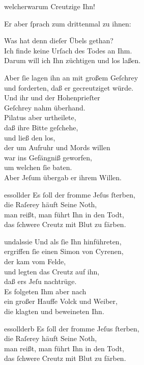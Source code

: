 \documentclass[tocstyle=ref-genre]{ees}
\begin{document}
{\begin{movement}{welcherwarum}
  \voice[Chor]
  Creutzige Ihn!

  \voice[Evangelist]
  Er aber ſprach zum drittenmal zu ihnen:

  \voice[Pilatus]
  Was hat denn dieſer Übels gethan?\\
  Ich finde keine Urſach des Todes an Ihm.\\
  Darum will ich Ihn züchtigen und los laßen.

  \voice[Evangelist]
  Aber ſie lagen ihn an mit großem Geſchrey\\
  und forderten, daß er gecreutziget würde.\\
  Und ihr und der Hohenprieſter\\
  Geſchrey nahm überhand.\\
  Pilatus aber urtheilete,\\
  daß ihre Bitte geſchehe,\\
  und ließ den los,\\
  der um Aufruhr und Mords willen\\
  war ins Gefängniß geworfen,\\
  um welchen ſie baten.\\
  Aber Jeſum übergab er ihrem Willen.
\end{movement}

\begin{movement}{essollder}\enlargethispage\baselineskip
  \voice[Chor]
  Es ſoll der fromme Jeſus ſterben,\\
  die Raſerey häuft Seine Noth,\\
  man reißt, man führt Ihn in den Todt,\\
  das ſchwere Creutz mit Blut zu färben.
\end{movement}

\begin{movement}{undalssie}
  \voice[Evangelist]
  Und als ſie Ihn hinführeten,\\
  ergriffen ſie einen Simon von Cyrenen,\\
  der kam vom Felde,\\
  und legten das Creutz auf ihn,\\
  daß ers Jeſu nachtrüge.\\
  Es folgeten Ihm aber nach\\
  ein großer Hauffe Volck und Weiber,\\
  die klagten und beweineten Ihn.
\end{movement}

\begin{movement}{essollderb}
  \voice[Chor]
  Es ſoll der fromme Jeſus ſterben,\\
  die Raſerey häuft Seine Noth,\\
  man reißt, man führt Ihn in den Todt,\\
  das ſchwere Creutz mit Blut zu färben.
\end{movement}

}
\end{document}
